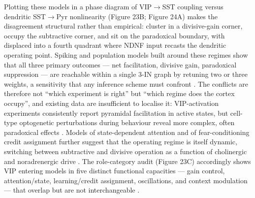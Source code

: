 \documentclass[11pt]{article}
\let\origrightarrow\rightarrow
\def\rightarrow{\ensuremath{\origrightarrow}}
\begin{document}
Plotting these models in a phase diagram of VIP\rightarrow SST coupling versus dendritic SST\rightarrow Pyr nonlinearity (Figure 23B; Figure 24A) makes the disagreement structural rather than empirical: \citep{Hertag2019, Veit2023} cluster in a divisive-gain corner, \citep{Tahvili2025a, Tahvili2025b} occupy the subtractive corner, and \citep{Garciadelmolino2017, Reimann2026, Sanzeni2020} sit on the paradoxical boundary, with \citep{Iqbal2025, Hartung2024, Vighagen2021} displaced into a fourth quadrant where NDNF input recasts the dendritic operating point. Spiking and population models built around these regimes \citep{Tahvili2025a, Pedrosa2020, Rossbroich2025} show that all three primary outcomes --- net facilitation, divisive gain, paradoxical suppression --- are reachable within a single 3-IN graph by retuning two or three weights, a sensitivity that any inference scheme must confront \citep{Garciadelmolino2017, Dellal2025}. The conflicts are therefore not ``which experiment is right'' but ``which regime does the cortex occupy'', and existing data are insufficient to localise it: VIP-activation experiments \citep{Pi2013, Fu2014, Lee2013} consistently report pyramidal facilitation in active states, but cell-type optogenetic perturbations during behaviour reveal more complex, often paradoxical effects \citep{Dipoppa2018, Veit2023, Bilash2023}. Models of state-dependent attention \citep{Garciadelmolino2017, Dipoppa2018, Hahn2022, Waitzmann2024, Poort2022, Wagatsuma2022} and of fear-conditioning credit assignment  further suggest that the operating regime is itself dynamic, switching between subtractive and divisive operation as a function of cholinergic and noradrenergic drive \citep{Fu2014, Pakan2016, Anastasiades2021a}. The role-category audit (Figure 23C) accordingly shows VIP entering models in five distinct functional capacities --- gain control, attention/state, learning/credit assignment, oscillations, and context modulation --- that overlap but are not interchangeable \citep{Hertag2019, Garciadelmolino2017, Veit2023, Lee2025, Furutachi2024, Shen2023, Yang2016}.
\end{document}
